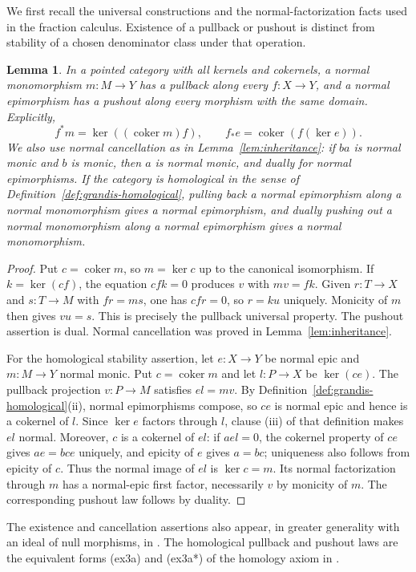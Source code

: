 \documentclass[11pt,reqno,a4paper]{amsart}
\newtheorem{lemma}[theorem]{Lemma}
\theoremstyle{definition}
\theoremstyle{remark}
\DeclareMathOperator{\coker}{coker}
\newcommand{\0}{\mathbf{0}}
\renewcommand{\1}{\mathbf{1}}
\begin{document}
We first recall the universal constructions and the normal-factorization facts used in the fraction calculus. Existence of a pullback or pushout is distinct from stability of a chosen denominator class under that operation.

\begin{lemma}\label{di:lem:basic}
In a pointed category with all kernels and cokernels, a normal monomorphism $m:M\to Y$ has a pullback along every $f:X\to Y$, and a normal epimorphism has a pushout along every morphism with the same domain. Explicitly,
\[
 f^*m=\ker((\coker m)f),\qquad
 f_*e=\coker(f(\ker e)).
\]
We also use normal cancellation as in Lemma~\ref{lem:inheritance}: if $ba$ is normal monic and $b$ is monic, then $a$ is normal monic, and dually for normal epimorphisms.
If the category is homological in the sense of
Definition~\ref{def:grandis-homological}, pulling back a normal
epimorphism along a normal monomorphism gives a normal epimorphism, and
dually pushing out a normal monomorphism along a normal
epimorphism gives a normal monomorphism.
\end{lemma}
\begin{proof}
Put $c=\coker m$, so $m=\ker c$ up to the canonical isomorphism. If $k=\ker(cf)$, the equation $cfk=0$ produces $v$ with $mv=fk$. Given $r:T\to X$ and $s:T\to M$ with $fr=ms$, one has $cfr=0$, so $r=ku$ uniquely. Monicity of $m$ then gives $vu=s$. This is precisely the pullback universal property. The pushout assertion is dual. Normal cancellation was proved in Lemma~\ref{lem:inheritance}.

For the homological stability assertion, let $e:X\to Y$ be normal
epic and $m:M\to Y$ normal monic. Put $c=\coker m$ and
let $l:P\to X$ be $\ker(ce)$. The pullback projection
$v:P\to M$ satisfies $el=mv$. By Definition~\ref{def:grandis-homological}\textup{(ii)},
normal epimorphisms compose, so $ce$ is normal epic and hence is
a cokernel of $l$. Since $\ker e$ factors through $l$, clause
\textup{(iii)} of that definition makes $el$ normal. Moreover, $c$ is a cokernel of $el$: if $ael=0$,
the cokernel property of $ce$ gives $ae=bce$ uniquely, and
epicity of $e$ gives $a=bc$; uniqueness also follows from
epicity of $c$. Thus the normal image of $el$ is $\ker c=m$.
Its normal factorization through $m$ has a normal-epic first
factor, necessarily $v$ by monicity of $m$. The corresponding
pushout law follows by duality.
\end{proof}

The existence and cancellation assertions also appear, in greater
generality with an ideal of null morphisms, in
\cite[Lemmas~2.6 and~2.9]{Fritz}. The homological pullback and
pushout laws are the equivalent forms \textup{(ex3a)} and
\textup{(ex3a*)} of the homology axiom in
\cite[Section~1.6, p.~144]{Grandis92}.
\end{document}
